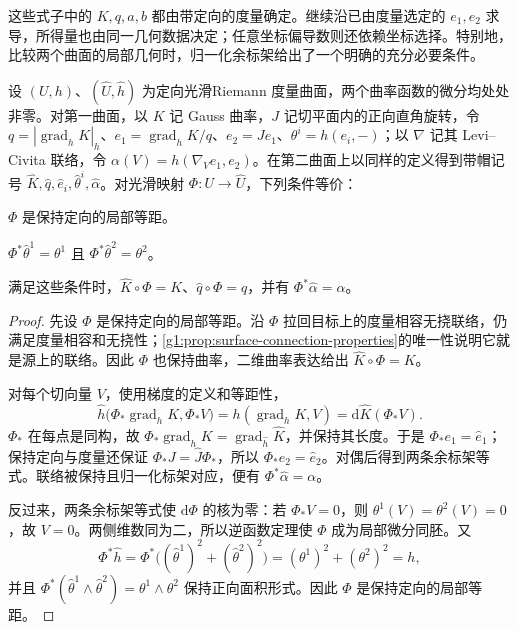 这些式子中的 \(K,q,a,b\) 都由带定向的度量确定。继续沿已由度量选定的 \(e_1,e_2\) 求导，所得量也由同一几何数据决定；任意坐标偏导数则还依赖坐标选择。特别地，比较两个曲面的局部几何时，归一化余标架给出了一个明确的充分必要条件。

\begin{proposition}\label{g1:prop:normalized-coframe-equivalence}
	设 \((U,h)\)、\((\widehat U,\widehat h)\) 为定向光滑Riemann 度量曲面，两个曲率函数的微分均处处非零。对第一曲面，以 \(K\) 记 Gauss 曲率，\(J\) 记切平面内的正向直角旋转，令 \(q=|\operatorname{grad}_h K|_h\)、\(e_1=\operatorname{grad}_h K/q\)、\(e_2=Je_1\)、\(\theta^i=h(e_i,-)\)；以 \(\nabla\) 记其 Levi--Civita 联络，令 \(\alpha(V)=h(\nabla_Ve_1,e_2)\)。在第二曲面上以同样的定义得到带帽记号 \(\widehat K,\widehat q,\widehat e_i,\widehat\theta^i,\widehat\alpha\)。对光滑映射 \(\Phi:U\to\widehat U\)，下列条件等价：
	\begin{equivalences}
		\item \(\Phi\) 是保持定向的局部等距。
		\item \(\Phi^*\widehat\theta^1=\theta^1\) 且 \(\Phi^*\widehat\theta^2=\theta^2\)。
	\end{equivalences}
	满足这些条件时，\(\widehat K\circ\Phi=K\)、\(\widehat q\circ\Phi=q\)，并有 \(\Phi^*\widehat\alpha=\alpha\)。
\end{proposition}
\begin{proof}
	先设 \(\Phi\) 是保持定向的局部等距。沿 \(\Phi\) 拉回目标上的度量相容无挠联络，仍满足度量相容和无挠性；\cref{g1:prop:surface-connection-properties}的唯一性说明它就是源上的联络。因此 \(\Phi\) 也保持曲率，二维曲率表达给出 \(\widehat K\circ\Phi=K\)。

	对每个切向量 \(V\)，使用梯度的定义和等距性，
	\[
		\widehat h\bigl(\Phi_*\operatorname{grad}_hK,\Phi_*V\bigr)
		=h(\operatorname{grad}_hK,V)
		=\mathrm{d}\widehat K(\Phi_*V).
	\]
	\(\Phi_*\) 在每点是同构，故 \(\Phi_*\operatorname{grad}_hK=\operatorname{grad}_{\widehat h}\widehat K\)，并保持其长度。于是 \(\Phi_*e_1=\widehat e_1\)；保持定向与度量还保证 \(\Phi_*J=\widehat J\Phi_*\)，所以 \(\Phi_*e_2=\widehat e_2\)。对偶后得到两条余标架等式。联络被保持且归一化标架对应，便有 \(\Phi^*\widehat\alpha=\alpha\)。

	反过来，两条余标架等式使 \(\mathrm{d}\Phi\) 的核为零：若 \(\Phi_*V=0\)，则 \(\theta^1(V)=\theta^2(V)=0\)，故 \(V=0\)。两侧维数同为二，所以逆函数定理使 \(\Phi\) 成为局部微分同胚。又
	\[
		\Phi^*\widehat h
		=\Phi^*\bigl((\widehat\theta^1)^2+(\widehat\theta^2)^2\bigr)
		=(\theta^1)^2+(\theta^2)^2=h,
	\]
	并且 \(\Phi^*(\widehat\theta^1\wedge\widehat\theta^2)=\theta^1\wedge\theta^2\) 保持正向面积形式。因此 \(\Phi\) 是保持定向的局部等距。
\end{proof}

